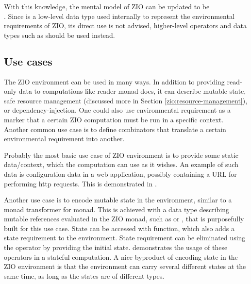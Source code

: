 

With this knowledge, the mental model of ZIO can be updated to be \\. Since  is a low-level data type used internally to represent the environmental requirements of ZIO, its direct use is not advised, higher-level operators and data types such as   should be used instead.


\subsection{Use cases}
The ZIO environment can be used in many ways. In addition to providing read-only data to computations like reader monad does, it can describe mutable state, safe resource management (discussed more in Section \ref{zio:resource-management}), or dependency-injection. One could also use environmental requirement as a marker that a certain ZIO computation must be run in a specific context. Another common use case is to define combinators that translate a certain environmental requirement into another.

Probably the most basic use case of ZIO environment is to provide some static data/context, which the computation can use as it wishes. An example of such data is configuration data in a web application, possibly containing a URL for performing http requests. This is demonstrated in .



Another use case is to encode mutable state in the environment, similar to a monad transformer for  monad. This is achieved with a data type describing mutable references evaluated in the ZIO monad, such as  or , that is purposefully built for this use case. State can be accessed with  function, which also adds a state requirement to the environment. State requirement can be eliminated using the  operator by providing the initial state.  demonstrates the usage of these operators in a stateful computation. A nice byproduct of encoding state in the ZIO environment is that the environment can carry several different states at the same time, as long as the states are of different types.



